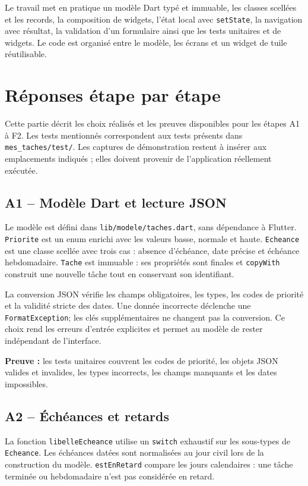 \documentclass[12pt,a4paper]{report}
\begin{document}
Le travail met en pratique un modèle Dart typé et immuable, les classes scellées et les records, la composition de widgets, l’état local avec \texttt{setState}, la navigation avec résultat, la validation d’un formulaire ainsi que les tests unitaires et de widgets. Le code est organisé entre le modèle, les écrans et un widget de tuile réutilisable.

\chapter{Réponses étape par étape}

Cette partie décrit les choix réalisés et les preuves disponibles pour les étapes A1 à F2. Les tests mentionnés correspondent aux tests présents dans \texttt{mes\_taches/test/}. Les captures de démonstration restent à insérer aux emplacements indiqués ; elles doivent provenir de l’application réellement exécutée.

\section{A1 -- Modèle Dart et lecture JSON}

Le modèle est défini dans \texttt{lib/modele/taches.dart}, sans dépendance à Flutter. \texttt{Priorite} est un enum enrichi avec les valeurs basse, normale et haute. \texttt{Echeance} est une classe scellée avec trois cas : absence d’échéance, date précise et échéance hebdomadaire. \texttt{Tache} est immuable : ses propriétés sont finales et \texttt{copyWith} construit une nouvelle tâche tout en conservant son identifiant.

La conversion JSON vérifie les champs obligatoires, les types, les codes de priorité et la validité stricte des dates. Une donnée incorrecte déclenche une \texttt{FormatException}; les clés supplémentaires ne changent pas la conversion. Ce choix rend les erreurs d’entrée explicites et permet au modèle de rester indépendant de l’interface.

\textbf{Preuve :} les tests unitaires couvrent les codes de priorité, les objets JSON valides et invalides, les types incorrects, les champs manquants et les dates impossibles.

\section{A2 -- Échéances et retards}

La fonction \texttt{libelleEcheance} utilise un \texttt{switch} exhaustif sur les sous-types de \texttt{Echeance}. Les échéances datées sont normalisées au jour civil lors de la construction du modèle. \texttt{estEnRetard} compare les jours calendaires : une tâche terminée ou hebdomadaire n’est pas considérée en retard.
\end{document}
